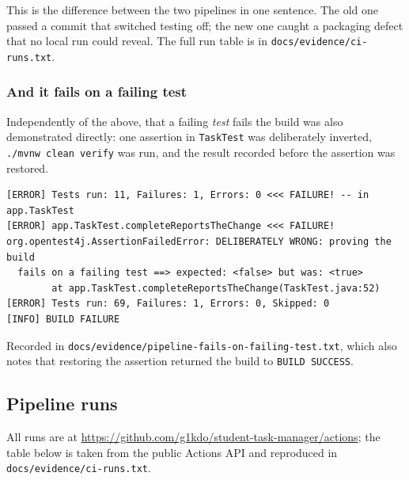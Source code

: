 \documentclass[11pt,a4paper]{article}
\newcommand{\code}[1]{\texttt{\small #1}}
\begin{document}
This is the difference between the two pipelines in one sentence. The old one
passed a commit that switched testing off; the new one caught a packaging
defect that no local run could reveal. The full run table is in
\code{docs/evidence/ci-runs.txt}.

\subsubsection*{And it fails on a failing test}

Independently of the above, that a failing \emph{test} fails the build was also
demonstrated directly: one assertion in \code{TaskTest} was deliberately
inverted, \code{./mvnw clean verify} was run, and the result recorded before
the assertion was restored.

\begin{lstlisting}[style=plain]
[ERROR] Tests run: 11, Failures: 1, Errors: 0 <<< FAILURE! -- in app.TaskTest
[ERROR] app.TaskTest.completeReportsTheChange <<< FAILURE!
org.opentest4j.AssertionFailedError: DELIBERATELY WRONG: proving the build
  fails on a failing test ==> expected: <false> but was: <true>
        at app.TaskTest.completeReportsTheChange(TaskTest.java:52)
[ERROR] Tests run: 69, Failures: 1, Errors: 0, Skipped: 0
[INFO] BUILD FAILURE
\end{lstlisting}

\noindent Recorded in \code{docs/evidence/pipeline-fails-on-failing-test.txt},
which also notes that restoring the assertion returned the build to
\code{BUILD SUCCESS}.

\subsection{Pipeline runs}

All runs are at
\url{https://github.com/g1kdo/student-task-manager/actions}; the table below is
taken from the public Actions API and reproduced in
\code{docs/evidence/ci-runs.txt}.
\end{document}
